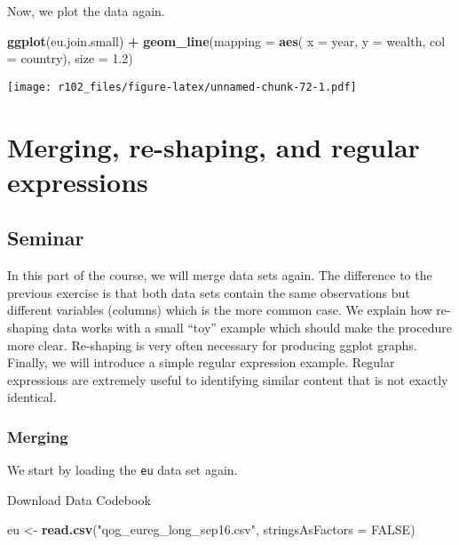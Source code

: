 \documentclass[]{article}
\newenvironment{Shaded}{\begin{snugshade}}{\end{snugshade}}
\newcommand{\DataTypeTok}[1]{\textcolor[rgb]{0.13,0.29,0.53}{#1}}
\newcommand{\FloatTok}[1]{\textcolor[rgb]{0.00,0.00,0.81}{#1}}
\newcommand{\KeywordTok}[1]{\textcolor[rgb]{0.13,0.29,0.53}{\textbf{#1}}}
\newcommand{\NormalTok}[1]{#1}
\newcommand{\OperatorTok}[1]{\textcolor[rgb]{0.81,0.36,0.00}{\textbf{#1}}}
\newcommand{\OtherTok}[1]{\textcolor[rgb]{0.56,0.35,0.01}{#1}}
\newcommand{\StringTok}[1]{\textcolor[rgb]{0.31,0.60,0.02}{#1}}
\begin{document}
Now, we plot the data again.

\begin{Shaded}
\begin{Highlighting}[]
\KeywordTok{ggplot}\NormalTok{(eu.join.small) }\OperatorTok{+}
\StringTok{    }\KeywordTok{geom_line}\NormalTok{(}\DataTypeTok{mapping =} \KeywordTok{aes}\NormalTok{( }\DataTypeTok{x =}\NormalTok{ year, }\DataTypeTok{y =}\NormalTok{ wealth, }\DataTypeTok{col =}\NormalTok{ country), }\DataTypeTok{size =} \FloatTok{1.2}\NormalTok{)}
\end{Highlighting}
\end{Shaded}

\texttt{[image: r102\_files/figure-latex/unnamed-chunk-72-1.pdf]}

\hypertarget{merging-re-shaping-and-regular-expressions}{%
\section{Merging, re-shaping, and regular expressions}\label{merging-re-shaping-and-regular-expressions}}

\hypertarget{seminar-1}{%
\subsection{Seminar}\label{seminar-1}}

In this part of the course, we will merge data sets again. The difference to the previous exercise is that both data sets contain the same observations but different variables (columns) which is the more common case. We explain how re-shaping data works with a small ``toy'' example which should make the procedure more clear. Re-shaping is very often necessary for producing ggplot graphs. Finally, we will introduce a simple regular expression example. Regular expressions are extremely useful to identifying similar content that is not exactly identical.

\hypertarget{merging}{%
\subsubsection{Merging}\label{merging}}

We start by loading the \texttt{eu} data set again.

Download Data
Codebook

\begin{Shaded}
\begin{Highlighting}[]
\NormalTok{eu <-}\StringTok{ }\KeywordTok{read.csv}\NormalTok{(}\StringTok{"qog_eureg_long_sep16.csv"}\NormalTok{, }\DataTypeTok{stringsAsFactors =} \OtherTok{FALSE}\NormalTok{)}
\end{Highlighting}
\end{Shaded}
\end{document}
